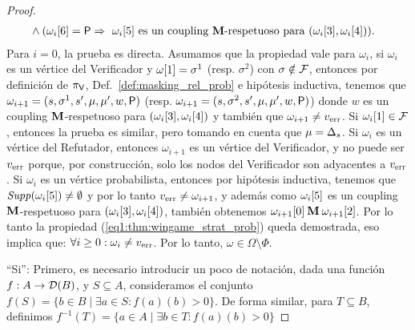 \begin{proof}
\begin{align}
&\wedge (\pr{6}{\omega_i} = \Probabilistic \Rightarrow \text{ $\pr{5}{\omega_i}$ es un coupling $\M$-respetuoso para $(\pr{3}{\omega_i},  \pr{4}{\omega_i})$}). \label{eq1:thm:wingame_strat_prob}
\end{align}
Para $i=0$, la prueba es directa. Asumamos que la propiedad vale para $\omega_i$, si $\omega_i$ es un vértice del Verificador y 
$\pr{1}{\omega} = \sigma^1$ (resp. $\sigma^2$) con $\sigma \notin \faults$, entonces por definición de $\strat{\Verifier}$, Def.~\ref{def:masking_rel_prob} e hipótesis inductiva, 
tenemos que $\omega_{i+1} =  (s, \sigma^1, s', \mu, \mu', w,  \Probabilistic)$
(resp. $\omega_{i+1} =  (s, \sigma^2, s', \mu, \mu', w, \Probabilistic)$) donde $w$ es un coupling
$\M$-respetuoso para $(\pr{3}{\omega_i},  \pr{4}{\omega_i})$ y también que  
$\omega_{i+1} \neq \ErrorSt$. Si $\pr{1}{\omega_i} \in \faults$,
entonces la prueba es similar, pero tomando en cuenta que $\mu = \Dirac_s$.
Si $\omega_i$ es un vértice del Refutador, entonces $\omega_{i+1}$ es un vértice del Verificador, y no puede ser $\ErrorSt$ porque, por construcción, solo los nodos del Verificador son adyacentes a $\ErrorSt$.
Si $\omega_i$ es un vértice probabilista, entonces por hipótesis inductiva, tenemos que $\support{\pr{5}{\omega_i}} \neq \emptyset$ y por lo tanto $\ErrorSt \neq \omega_{i+1}$,
y además como $\pr{5}{\omega_i}$ es un coupling $\M$-respetuoso para $(\pr{3}{\omega_i},  \pr{4}{\omega_i})$, también obtenemos  
$ \pr{0}{\omega_{i+1}}  \M \pr{2}{\omega_{i+1}}$. Por lo tanto la propiedad (\ref{eq1:thm:wingame_strat_prob}) queda demostrada,  eso implica que:
$\forall i \geq 0 : \omega_i \neq \ErrorSt$. Por lo tanto, $\omega \in \Omega \setminus \Phi$.

``Si'': Primero, es necesario introducir un poco de notación, dada una función $f: A \rightarrow \Dist(B)$,  y $S \subseteq A$, 
consideramos el conjunto $f(S)= \{ b \in B \mid \exists a \in S: f(a)(b) > 0 \}$.
De forma similar, para $T \subseteq B$, definimos $f^{-1}(T) = \{ a \in A \mid \exists b \in T : f(a)(b) > 0\}$


\end{proof}
